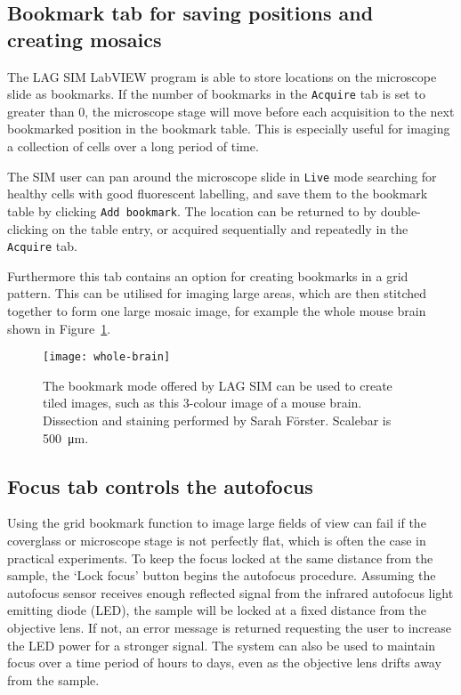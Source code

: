\subsection{Bookmark tab for saving positions and creating mosaics} \label{sec:lagsimBookmarks}
The LAG SIM LabVIEW program is able to store locations on the microscope slide as bookmarks.
If the number of bookmarks in the \texttt{Acquire} tab is set to greater than 0, the microscope stage will move before each acquisition to the next bookmarked position in the bookmark table.
This is especially useful for imaging a collection of cells over a long period of time.

The SIM user can pan around the microscope slide in \texttt{Live} mode searching for healthy cells with good fluorescent labelling, and save them to the bookmark table by clicking \texttt{Add bookmark}.
The location can be returned to by double-clicking on the table entry, or acquired sequentially and repeatedly in the \texttt{Acquire} tab.

Furthermore this tab contains an option for creating bookmarks in a grid pattern.
This can be utilised for imaging large areas, which are then stitched together to form one large mosaic image, for example the whole mouse brain shown in Figure~\ref{fig:wholebrain}.

\begin{figure}[p]
\centering
\texttt{[image: whole-brain]}
\caption[LAG SIM: An image of a full mouse brain can be captured as a mosaic of images]{The bookmark mode offered by LAG SIM can be used to create tiled images, such as this 3-colour image of a mouse brain. Dissection and staining performed by Sarah F{\"o}rster. Scalebar is \SI{500}{\micro\metre}.}
\label{fig:wholebrain}
\end{figure}

\subsection{Focus tab controls the autofocus} \label{sec:lagsimFocus}
Using the grid bookmark function to image large fields of view can fail if the coverglass or microscope stage is not perfectly flat, which is often the case in practical experiments.
To keep the focus locked at the same distance from the sample, the `Lock focus' button begins the autofocus procedure.
Assuming the autofocus sensor receives enough reflected signal from the infrared autofocus light emitting diode (LED), the sample will be locked at a fixed distance from the objective lens.
If not, an error message is returned requesting the user to increase the LED power for a stronger signal.
The system can also be used to maintain focus over a time period of hours to days, even as the objective lens drifts away from the sample.

